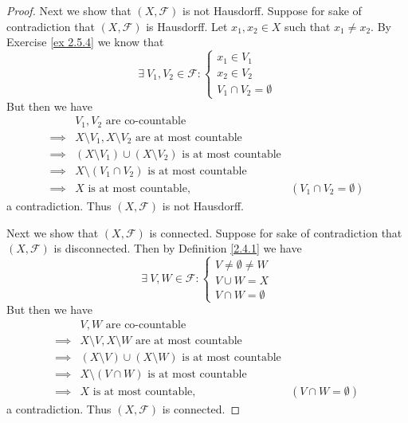 \begin{proof}
    Next we show that \((X, \mathcal{F})\) is not Hausdorff.
    Suppose for sake of contradiction that \((X, \mathcal{F})\) is Hausdorff.
    Let \(x_1, x_2 \in X\) such that \(x_1 \neq x_2\).
    By Exercise \ref{ex 2.5.4} we know that
    \[
        \exists\ V_1, V_2 \in \mathcal{F} : \begin{cases}
            x_1 \in V_1 \\
            x_2 \in V_2 \\
            V_1 \cap V_2 = \emptyset
        \end{cases}
    \]
    But then we have
    \begin{align*}
                 & V_1, V_2 \text{ are co-countable}                                                                  \\
        \implies & X \setminus V_1, X \setminus V_2 \text{ are at most countable}                                     \\
        \implies & (X \setminus V_1) \cup (X \setminus V_2) \text{ is at most countable}                              \\
        \implies & X \setminus (V_1 \cap V_2) \text{ is at most countable}                                            \\
        \implies & X \text{ is at most countable},                                       & (V_1 \cap V_2 = \emptyset)
    \end{align*}
    a contradiction.
    Thus \((X, \mathcal{F})\) is not Hausdorff.

    Next we show that \((X, \mathcal{F})\) is connected.
    Suppose for sake of contradiction that \((X, \mathcal{F})\) is disconnected.
    Then by Definition \ref{2.4.1} we have
    \[
        \exists\ V, W \in \mathcal{F} : \begin{cases}
            V \neq \emptyset \neq W \\
            V \cup W = X            \\
            V \cap W = \emptyset
        \end{cases}
    \]
    But then we have
    \begin{align*}
                 & V, W \text{ are co-countable}                                                              \\
        \implies & X \setminus V, X \setminus W \text{ are at most countable}                                 \\
        \implies & (X \setminus V) \cup (X \setminus W) \text{ is at most countable}                          \\
        \implies & X \setminus (V \cap W) \text{ is at most countable}                                        \\
        \implies & X \text{ is at most countable},                                   & (V \cap W = \emptyset)
    \end{align*}
    a contradiction.
    Thus \((X, \mathcal{F})\) is connected.


\end{proof}
